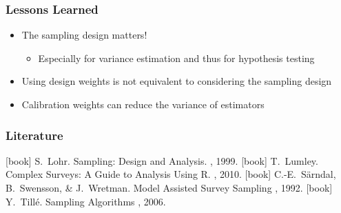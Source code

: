 \documentclass{beamer}\usepackage[]{graphicx}\usepackage[]{color}
\newcommand{\V}[1]{\text{V}\left(#1\right)}
\begin{document}
%  

\begin{frame}\frametitle{Lessons Learned}
\begin{itemize}
\item<1-> \alert{The sampling design matters!} 
 \begin{itemize}
  \item<2-> Especially for variance estimation and thus for hypothesis testing
 \end{itemize}
\item<3-> Using design weights is \alert{not equivalent} to considering the sampling design
\item<4-> Calibration weights can \alert{reduce} the variance of estimators
\end{itemize}
\end{frame}


\begin{frame}[allowframebreaks]\frametitle{Literature}    
  \begin{thebibliography}{10}    
   [book]
    S.~Lohr.
    \newblock  Sampling: Design and Analysis.
    , 1999.
   [book]
    T.~Lumley.
    \newblock Complex Surveys: A Guide to Analysis Using R.
    , 2010.
   [book]
    C.-E.~S\"{a}rndal, B.~Swensson, \& J.~Wretman.
    \newblock Model Assisted Survey Sampling
    , 1992.
    [book]
   Y.~Till\'{e}.
  \newblock  Sampling Algorithms
    , 2006.
  \end{thebibliography}
\end{frame} 
\end{document}
